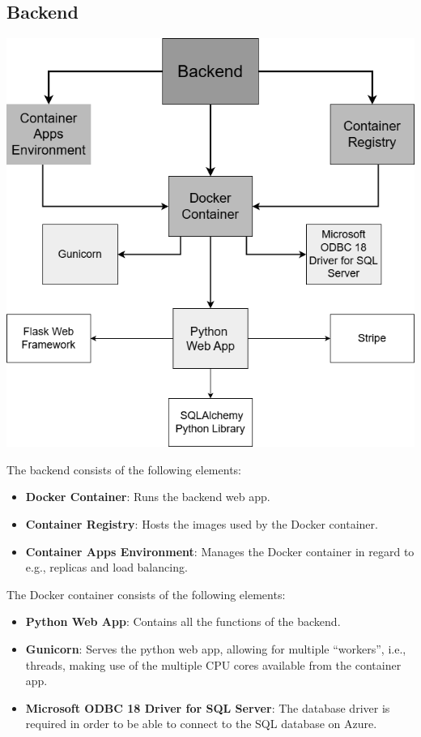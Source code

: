 \subsection{Backend}
\includegraphics{images/backend_building_block.png}

The backend consists of the following elements:

\begin{itemize}
    \item \textbf{Docker Container}: Runs the backend web app.
    \item \textbf{Container Registry}: Hosts the images used by the Docker container.
    \item \textbf{Container Apps Environment}: Manages the Docker container in regard to e.g., replicas and load balancing.
\end{itemize}

The Docker container consists of the following elements:

\begin{itemize}
    \item \textbf{Python Web App}: Contains all the functions of the backend.
    \item \textbf{Gunicorn}: Serves the python web app, allowing for multiple “workers”, 
    i.e., threads, making use of the multiple CPU cores available from the container app.
    \item \textbf{Microsoft ODBC 18 Driver for SQL Server}: The database driver is required in order to be able to connect to the SQL database on Azure.
\end{itemize}

